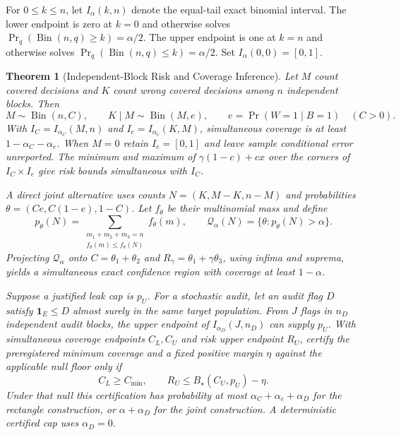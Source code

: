 \documentclass[11pt,a4paper]{article}
\newtheorem{theorem}{Theorem}[section]
\begin{document}
For $0\le k\le n$, let $I_\alpha(k,n)$ denote the equal-tail exact binomial interval. The lower endpoint is zero at $k=0$ and otherwise solves $\Pr_q(\operatorname{Bin}(n,q)\ge k)=\alpha/2$. The upper endpoint is one at $k=n$ and otherwise solves $\Pr_q(\operatorname{Bin}(n,q)\le k)=\alpha/2$. Set $I_\alpha(0,0)=[0,1]$.

\begin{theorem}[Independent-Block Risk and Coverage Inference]\label{thm:independent-block-risk-intervals}
Let $M$ count covered decisions and $K$ count wrong covered decisions among $n$ independent blocks. Then
\[
 M\sim\operatorname{Bin}(n,C),\qquad K\mid M\sim\operatorname{Bin}(M,e),
 \qquad e=\Pr(W=1\mid B=1)\quad(C>0).
\]
With $I_C=I_{\alpha_C}(M,n)$ and $I_e=I_{\alpha_e}(K,M)$, simultaneous coverage is at least $1-\alpha_C-\alpha_e$. When $M=0$ retain $I_e=[0,1]$ and leave sample conditional error unreported. The minimum and maximum of $\gamma(1-c)+cx$ over the corners of $I_C\times I_e$ give risk bounds simultaneous with $I_C$.

A direct joint alternative uses counts $N=(K,M-K,n-M)$ and probabilities $\theta=(Ce,C(1-e),1-C)$. Let $f_\theta$ be their multinomial mass and define
\[
 p_\theta(N)=\sum_{\substack{m_1+m_2+m_3=n\\f_\theta(m)\le f_\theta(N)}} f_\theta(m),
 \qquad \mathcal Q_\alpha(N)=\{\theta:p_\theta(N)>\alpha\}.
\]
Projecting $\mathcal Q_\alpha$ onto $C=\theta_1+\theta_2$ and $R_\gamma=\theta_1+\gamma\theta_3$, using infima and suprema, yields a simultaneous exact confidence region with coverage at least $1-\alpha$.

Suppose a justified leak cap is $p_U$. For a stochastic audit, let an audit flag $D$ satisfy $\mathbf1_E\le D$ almost surely in the same target population. From $J$ flags in $n_D$ independent audit blocks, the upper endpoint of $I_{\alpha_D}(J,n_D)$ can supply $p_U$. With simultaneous coverage endpoints $C_L,C_U$ and risk upper endpoint $R_U$, certify the preregistered minimum coverage and a fixed positive margin $\eta$ against the applicable null floor only if
\[
 C_L\ge C_{\min},\qquad R_U\le B_\star(C_U,p_U)-\eta .
\]
Under that null this certification has probability at most $\alpha_C+\alpha_e+\alpha_D$ for the rectangle construction, or $\alpha+\alpha_D$ for the joint construction. A deterministic certified cap uses $\alpha_D=0$.
\end{theorem}
\end{document}
